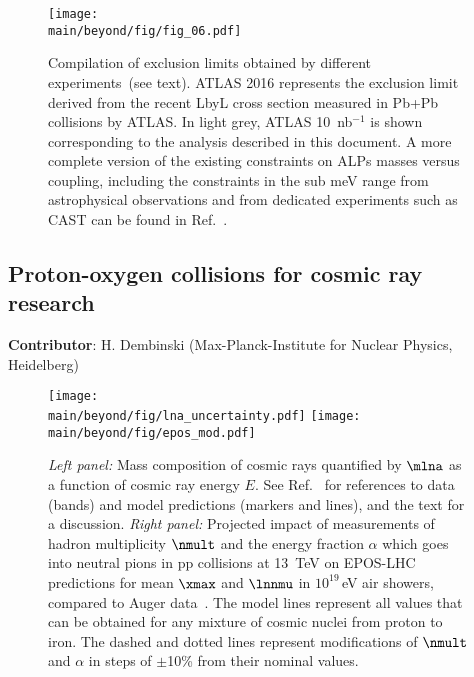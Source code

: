\documentclass[../report.tex]{subfiles}
\providecommand{\main}{..}
\begin{document}
\begin{figure}[!htbp]
\centering
  \texttt{[image: \\main/beyond/fig/fig\_06.pdf]}
  \caption{Compilation of exclusion limits obtained by different experiments~(see text).
  ATLAS 2016 represents the exclusion limit derived from the recent LbyL cross section measured in Pb+Pb collisions by ATLAS.
  In light grey, ATLAS 10~nb$^{-1}$ is shown corresponding to the analysis described in this document. A more complete version of the existing constraints on ALPs masses versus coupling, including the
  constraints in the sub meV range from astrophysical observations and
  from dedicated experiments such as CAST can be found in Ref.~\cite{Bauer:2017ris}.}
  \label{fig:alp-lambda-limits}
\end{figure}

\subsection{Proton-oxygen collisions for cosmic ray research}
\label{sec:pOcosmic}
\textbf{Contributor}: H. Dembinski (Max-Planck-Institute for Nuclear Physics, Heidelberg)


\begin{figure}
\texttt{[image: \\main/beyond/fig/lna\_uncertainty.pdf]}
\texttt{[image: \\main/beyond/fig/epos\_mod.pdf]}
\caption{\emph{Left panel:} Mass composition of cosmic rays quantified by $\mlna$ as a function of cosmic ray energy $E$. See Ref.~\cite{kampert_cr_review} for references to data (bands) and model predictions (markers and lines), and the text for a discussion. \emph{Right panel:} Projected impact of measurements of hadron multiplicity $\nmult$ and the energy fraction $\alpha$ which goes into neutral pions in pp collisions at \SI{13}{TeV} on EPOS-LHC predictions for mean $\xmax$ and $\lnnmu$ in $10^{19}$\,\si{eV} air showers, compared to Auger data~\cite{Aab:2014pza}. The model lines represent all values that can be obtained for any mixture of cosmic nuclei from proton to iron. The dashed and dotted lines represent modifications of $\nmult$ and $\alpha$ in steps of $\pm$10\% from their nominal values.}
\label{fig:cosmic_rays}
\end{figure}
\end{document}
